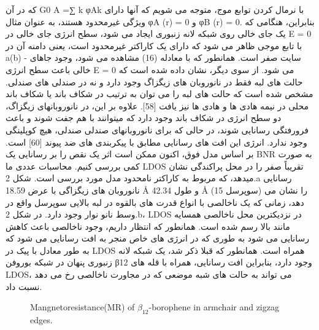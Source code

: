 که در آن G0 A =∑ k φAk با نرمال کردن توابع موج، متوجه می شویم که آنها دارای ویژگی غیرمحدود هستند، به عنوان مثال φA (r) = 0 و φB (r) = 0. بنابراین، هنگامی که یک جای خالی روی شبکه لانه زنبوری ایجاد می شود، سطح انرژی جای خالی در E = 0 با تابع موجی ظاهر می شود که دارای یک کاراکتر غیرمحدود است، یعنی دامنه آن در a(b) - سایت صفر است. همانطور که با معادله (16) مشاهده می شود، وجود جاهای خالی باعث سطح انرژی E = 0 می شود. از سوی دیگر، نشان داده شده است که حالت های لبه فقط در نانوروبان های زیگزاگ وجود دارد و نه در صندلی های صندلی. مشخص شده است که حالت های لبه را می توان به ترتیب در شکاف باند یا شکاف باند محلی در نیمه هادی ها و هادی ها نیز یافت [58]. علاوه بر این، در نانوروبانهای زیگزاگ، دو سطح انرژی در شکاف باند وجود دارد که میتوانند با هم جفت شوند و باعث فرورفتگی رسانایی شوند، در حالی که برای نانوروبانهای صندلی صندلی، هیچ کوپلینگی وجود ندارد. انرژی این افت های رسانایی مطابق با پیکربندی های ضد پیوند [60] است. بر اساس مدل فوق، اکنون ممکن است اثر یک نقص را بر رسانایی یک BNR به صورت کمی بررسی کنیم. محاسبات عددی ما LDOS تقریباً صفر را در محل پراکندگی نشان میدهد، که مربوط به کاراکتر نامحدود مدل مورد بررسی است. شکل 2.a رسانایی نانوروبان های زیگزاگی با عرض 18.59 Å و طول 42.34 Å (15 سوپرسل) را نشان می دهد، زمانی که یک ناخالصی با انواع قدرت های بالقوه در لبه بالایی سوپرسل واقع در وسط نانو نوار وجود دارد. در شکل 2.b، LDOS در نزدیکترین محل ناخالصی همسایه مانند بالا رسم شده است. همانطور که انتظار داریم، وجود ناخالصی باعث کاهش رسانایی می شود به طوری که در انرژی های خاص منجر به افت رسانایی می شود که به طور معادل با پیک در LDOS همراه است. همانطور که قبلا ذکر شد، یک شبکه لانه زنبوری پنهان در شبکه بوروفن β12 وجود دارد، بنابراین افت رسانایی، همراه با قله های LDOS، می تواند به حالت های شبه موضعی که در مجاورت ناخالصی رخ می دهد نسبت داد.

\begin{figure}
    \centering
    \resizebox{0.45\textwidth}{!}{}
    \resizebox{0.45\textwidth}{!}{}
     \caption{Mangnetoresistance(MR) of $\beta_{12}$-borophene in armchair and zigzag edges.}
    \label{fig:MR}
\end{figure}

